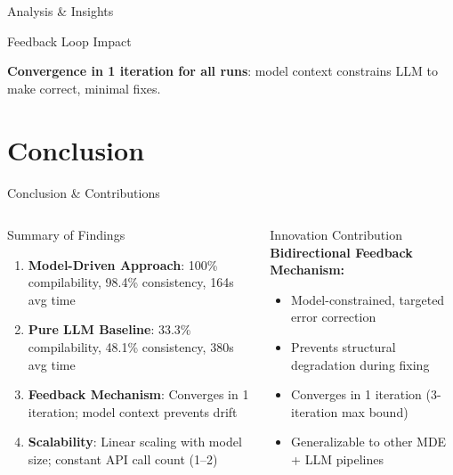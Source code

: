 \documentclass[10pt,aspectratio=169]{beamer}
\begin{document}
\begin{frame}{Analysis \& Insights}
\begin{block}{Feedback Loop Impact}
\begin{center}
\vspace{4pt}
\textbf{Convergence in 1 iteration for all runs}: model context constrains LLM to make correct, minimal fixes.
\end{center}
\end{block}

\end{frame}

\section{Conclusion}
\begin{frame}{Conclusion \& Contributions}
\vspace{-8pt}

\begin{columns}[T]
\begin{block}{Summary of Findings}
\begin{enumerate}
    \item \textbf{Model-Driven Approach}: 100\% compilability, 98.4\% consistency, 164s avg time
    \item \textbf{Pure LLM Baseline}: 33.3\% compilability, 48.1\% consistency, 380s avg time
    \item \textbf{Feedback Mechanism}: Converges in 1 iteration; model context prevents drift
    \item \textbf{Scalability}: Linear scaling with model size; constant API call count (1--2)
\end{enumerate}
\end{block}

\begin{block}{Innovation Contribution}
\textbf{Bidirectional Feedback Mechanism:}
\begin{itemize}
    \item Model-constrained, targeted error correction
    \item Prevents structural degradation during fixing
    \item Converges in 1 iteration (3-iteration max bound)
    \item Generalizable to other MDE + LLM pipelines
\end{itemize}
\end{block}


\end{columns}
\end{frame}
\end{document}

